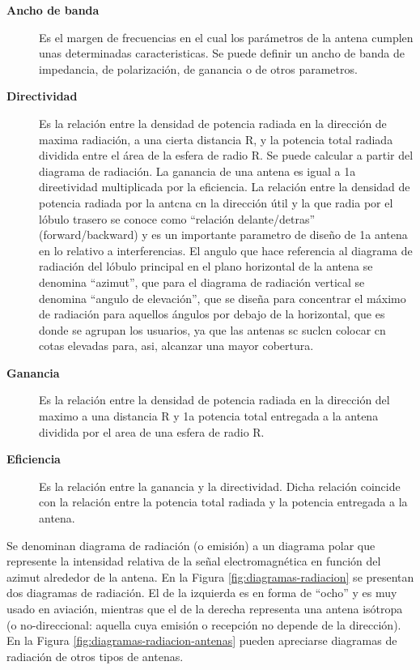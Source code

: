 \begin{description}
\item [\bf Ancho de banda] Es el margen de frecuencias en el cual los
  parámetros de la antena cumplen unas determinadas
  caracteristicas. Se puede deﬁnir un ancho de banda de impedancia, de
  polarización, de ganancia o de otros parametros.

\item [\bf Directividad] Es la relación entre la densidad de potencia radiada en la dirección de maxima radiación, a una cierta distancia R, y la potencia total radiada dividida entre el área de la esfera de radio R.
  Se puede calcular a partir del diagrama de radiación.
  La ganancia de una antena es igual a 1a direetividad multiplicada por la eﬁciencia. La relación entre la densidad de potencia radiada por la antcna cn la dirección útil y la que radia por el lóbulo trasero se conoce como “relación delante/detras” (forward/backward) y es un importante parametro de diseño de 1a antena en lo relativo a interferencias. El angulo que hace referencia al diagrama de radiación del lóbulo principal en el plano horizontal de la antena se denomina “azimut”, que para el diagrama de radiación vertical se denomina “angulo de elevación”, que se diseña para concentrar el máximo de radiación para aquellos ángulos por debajo de la horizontal, que es donde se agrupan los usuarios, ya que las antenas sc suclcn colocar cn cotas elevadas para, asi, alcanzar una mayor cobertura.

\item [\bf Ganancia] Es la relación entre la densidad de potencia radiada en la dirección del maximo a una distancia R y 1a potencia total entregada a la antena dividida por el area de una esfera de radio R. 
\item[\bf Eficiencia] Es la relación entre la ganancia y la directividad. Dicha relación coincide con la relación entre la potencia total radiada y la potencia entregada a la antena.

\end{description}






 Se denominan diagrama de radiaci\'on (o
  emisi\'on) a un diagrama polar que represente la intensidad relativa
  de la se\~nal electromagn\'etica en funci\'on del azimut alrededor
  de la antena.  En la Figura \ref{fig:diagramas-radiacion} se
  presentan dos diagramas de radiaci\'on. El de la izquierda es en
  forma de ``ocho'' y es muy usado en aviaci\'on, mientras que el de
  la derecha representa una antena is\'otropa (o no-direccional:
  aquella cuya emisi\'on o recepci\'on no depende de la direcci\'on).
En la Figura \ref{fig:diagramas-radiacion-antenas} pueden apreciarse diagramas de radiaci\'on 
de otros tipos de antenas.



